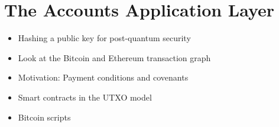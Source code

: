 \chapter{The Accounts Application Layer}

{\color{red}
\begin{itemize}
\item Hashing a public key for post-quantum security
\item Look at the Bitcoin and Ethereum transaction graph
\item Motivation: Payment conditions and covenants
\item Smart contracts in the UTXO model
\item Bitcoin scripts
\end{itemize}
}
